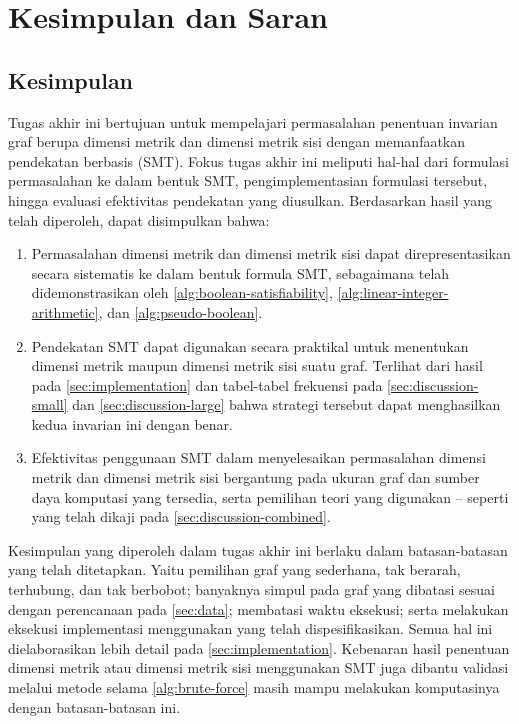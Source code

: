\chapter{Kesimpulan dan Saran}

\section{Kesimpulan}

Tugas akhir ini bertujuan untuk mempelajari permasalahan penentuan invarian graf berupa dimensi metrik dan dimensi metrik sisi dengan memanfaatkan pendekatan berbasis  (SMT). Fokus tugas akhir ini meliputi hal-hal dari formulasi permasalahan ke dalam bentuk SMT, pengimplementasian formulasi tersebut, hingga evaluasi efektivitas pendekatan yang diusulkan. Berdasarkan hasil yang telah diperoleh, dapat disimpulkan bahwa:

\begin{enumerate}
	\item Permasalahan dimensi metrik dan dimensi metrik sisi dapat direpresentasikan secara sistematis ke dalam bentuk formula SMT, sebagaimana telah didemonstrasikan oleh \autoref{alg:boolean-satisfiability}, \autoref{alg:linear-integer-arithmetic}, dan \autoref{alg:pseudo-boolean}.

	\item Pendekatan SMT dapat digunakan secara praktikal untuk menentukan dimensi metrik maupun dimensi metrik sisi suatu graf. Terlihat dari hasil pada \autoref{sec:implementation} dan tabel-tabel frekuensi pada \autoref{sec:discussion-small} dan \autoref{sec:discussion-large} bahwa strategi tersebut dapat menghasilkan kedua invarian ini dengan benar.

	\item Efektivitas penggunaan SMT dalam menyelesaikan permasalahan dimensi metrik dan dimensi metrik sisi bergantung pada ukuran graf dan sumber daya komputasi yang tersedia, serta pemilihan teori yang digunakan -- seperti yang telah dikaji pada \autoref{sec:discussion-combined}.
\end{enumerate}

Kesimpulan yang diperoleh dalam tugas akhir ini berlaku dalam batasan-batasan yang telah ditetapkan. Yaitu pemilihan graf yang sederhana, tak berarah, terhubung, dan tak berbobot; banyaknya simpul pada graf yang dibatasi sesuai dengan perencanaan pada \autoref{sec:data}; membatasi waktu eksekusi; serta melakukan eksekusi implementasi menggunakan  yang telah dispesifikasikan. Semua hal ini dielaborasikan lebih detail pada \autoref{sec:implementation}. Kebenaran hasil penentuan dimensi metrik atau dimensi metrik sisi menggunakan SMT juga dibantu validasi melalui metode  selama \autoref{alg:brute-force} masih mampu melakukan komputasinya dengan batasan-batasan ini.

